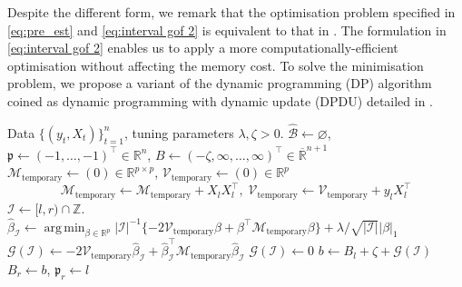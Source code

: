 \documentclass[11pt]{article}
\DeclareMathOperator*{\argmin}{arg\,min}
\newcommand{\I}{{\mathcal I }}
\theoremstyle{plain}
\theoremstyle{definition}
\begin{document}
Despite the different form, we remark that the optimisation problem specified in \eqref{eq:pre_est} and \eqref{eq:interval gof 2} is equivalent to that in \cite{rinaldo2021localizing}.  The formulation in \eqref{eq:interval gof 2} enables us to apply a more computationally-efficient optimisation without affecting the memory cost.
To solve the minimisation problem, we propose a variant of the dynamic programming (DP) algorithm \citep[e.g. Algorithm 1 in][]{friedrich2008complexity} coined as dynamic programming with dynamic update (DPDU) detailed in .


\begin{algorithm}[!ht]
\begin{algorithmic}
    \INPUT Data $\{(y_t, X_t)\}_{t =1}^{n }$, tuning parameters $\lambda, \zeta > 0$.
    \State $\widehat{\mathcal{B}} \leftarrow \varnothing$,\; $\mathfrak{p} \leftarrow (-1,\ldots, -1)^{\top} \in \mathbb{R}^n$,\; $B \leftarrow (-\zeta, \infty, \ldots, \infty)^{\top} \in \overline{\mathbb{R}}^{n+1}$
 	 \State $\mathcal{M}_{\text{temporary}} \leftarrow (0) \in \mathbb R^{p \times p}$,\; $\mathcal{V}_{\text{temporary}} \leftarrow (0) \in \mathbb R^p$
        \begin{equation}\label{eq:updated matrices} 
 	        \mathcal{M}_{\text{temporary}} \leftarrow \mathcal{M}_{\text{temporary}} + X_{l} X_{l}^\top, \; 
            \mathcal{V}_{\text{temporary}}  \leftarrow  \mathcal{V}_{\text{temporary}} + y_{l} X_{l}^\top
            \end{equation}
 	        \State $\I \leftarrow [l, r) \cap \mathbb{Z}$. 
            \If{$|\I| \ge \zeta$}
                \State $\widehat{\beta}_{ \mathcal I} \leftarrow \argmin_{\beta \in \mathbb R^p } |\mathcal I|^{-1} \{-2\mathcal V_{\text{temporary}}\beta + \beta^\top \mathcal M_{\text{temporary}}\beta\} + \lambda/\sqrt{| \I|} |\beta|_1$
                \State $\mathcal G (\I) \leftarrow -2    \mathcal V_{\text{temporary}}  \widehat \beta _{  \I  } + \widehat\beta _{  \I  } ^\top \mathcal M _{\text{temporary}} \widehat\beta _{  \I  }$    
            \Else
                \State$\mathcal G (\I )  \leftarrow 0$  
            \EndIf  
            \State $b \leftarrow B_{l}+ \zeta   + \mathcal G (\I)$
 	            \State $B_{r} \leftarrow  b$, $\mathfrak {p}_r  \leftarrow l$
            \EndIf  
        \EndFor

\end{algorithmic}
\end{algorithm}
\end{document}
